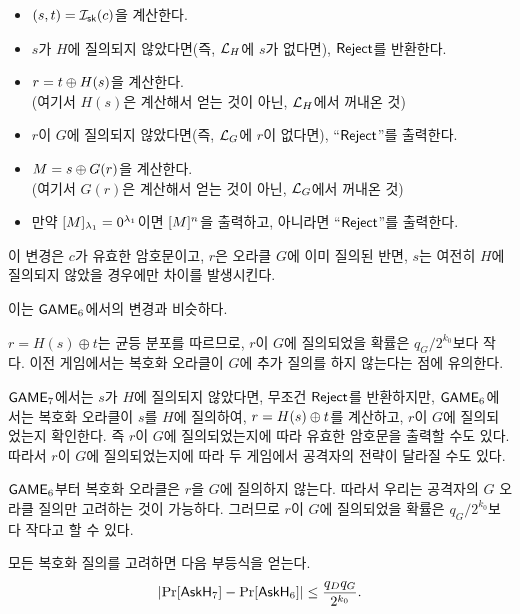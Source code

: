 \begin{tcolorbox}
	\begin{itemize}
		\item $(s,t) = \itd_{\sk}(\ct)$을 계산한다.
		\item $s$가 $H$에 질의되지 않았다면(즉, $\orcl_H$에 $s$가 없다면), $\reject$를 반환한다.
		\item $r = t \xor \hash(s)$을 계산한다. \\ (여기서 $H(s)$은 계산해서 얻는 것이 아닌, $\orcl_H$에서 꺼내온 것)
		\item $r$이 $G$에 질의되지 않았다면(즉, $\orcl_G$에 $r$이 없다면), “$\reject$”를 출력한다.
		\item $M = s \xor G(r)$을 계산한다. \\ (여기서 $G(r)$은 계산해서 얻는 것이 아닌, $\orcl_G$에서 꺼내온 것)
		\item 만약 $[M]_{\sp_1} = 0^{\sp_1}$이면 $[M]^{\mlen}$을 출력하고,
		아니라면 “$\reject$”를 출력한다.
	\end{itemize}
\end{tcolorbox}

이 변경은 $c$가 유효한 암호문이고, $r$은 오라클 $G$에 이미 질의된 반면, $s$는
여전히 $H$에 질의되지 않았을 경우에만 차이를 발생시킨다.

\begin{memo}
	이는 $\game_6$에서의 변경과 비슷하다.
\end{memo}

$r = H(s) \oplus t$는 균등 분포를 따르므로, $r$이 $G$에 질의되었을 확률은 $q_G /
2^{k_0}$보다 작다. 이전 게임에서는 복호화 오라클이 $G$에 추가 질의를 하지 않는다는
점에 유의한다. 

\begin{memo}
	$\game_7$에서는 $s$가 $H$에 질의되지 않았다면, 무조건 $\reject$를
	반환하지만, $\game_6$에서는 복호화 오라클이 $s$를 $H$에 질의하여, $r = H(s)
	\xor t$를 계산하고, $r$이 $G$에 질의되었는지 확인한다. 즉 $r$이 $G$에
	질의되었는지에 따라 유효한 암호문을 출력할 수도 있다. 따라서 $r$이 $G$에
	질의되었는지에 따라 두 게임에서 공격자의 전략이 달라질 수도 있다.
\end{memo}

\begin{memo}
	$\game_6$부터 복호화 오라클은 $r$을 $G$에 질의하지 않는다. 따라서 우리는
	공격자의 $G$ 오라클 질의만 고려하는 것이 가능하다. 그러므로 $r$이 $G$에
	질의되었을 확률은 $q_G / 2^{k_0}$보다 작다고 할 수 있다.
\end{memo}

모든 복호화 질의를 고려하면 다음 부등식을 얻는다.
$$
	\left| \Pr[\askH_7] - \Pr[\askH_6] \right| \leq \frac{q_D q_G}{2^{k_0}}.
$$

